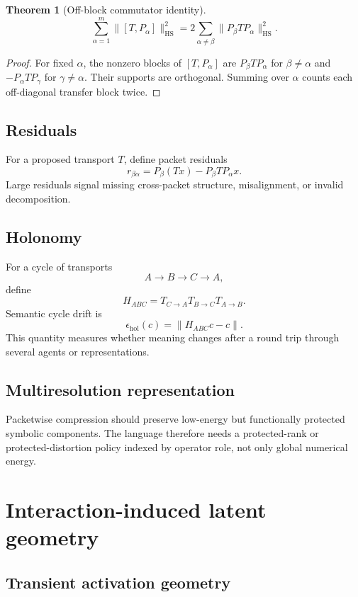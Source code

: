 \documentclass[11pt]{article}
\newtheorem{theorem}{Theorem}[section]
\theoremstyle{definition}
\theoremstyle{remark}
\begin{document}
\begin{theorem}[Off-block commutator identity]
\[
\sum_{\alpha=1}^m
\|[T,P_\alpha]\|_{\mathrm{HS}}^2
=
2\sum_{\alpha\ne\beta}
\|P_\beta T P_\alpha\|_{\mathrm{HS}}^2.
\]
\end{theorem}

\begin{proof}
For fixed \(\alpha\), the nonzero blocks of \([T,P_\alpha]\) are \(P_\beta T P_\alpha\) for \(\beta\ne\alpha\) and \(-P_\alpha T P_\gamma\) for \(\gamma\ne\alpha\). Their supports are orthogonal. Summing over \(\alpha\) counts each off-diagonal transfer block twice.
\end{proof}

\subsection{Residuals}

For a proposed transport \(T\), define packet residuals
\[
r_{\beta\alpha}
=
P_\beta(Tx)-P_\beta T P_\alpha x.
\]
Large residuals signal missing cross-packet structure, misalignment, or invalid decomposition.

\subsection{Holonomy}

For a cycle of transports
\[
A\to B\to C\to A,
\]
define
\[
H_{ABC}=T_{C\to A}T_{B\to C}T_{A\to B}.
\]
Semantic cycle drift is
\[
\epsilon_{\mathrm{hol}}(c)
=
\|H_{ABC}c-c\|.
\]
This quantity measures whether meaning changes after a round trip through several agents or representations.

\subsection{Multiresolution representation}

Packetwise compression should preserve low-energy but functionally protected symbolic components. The language therefore needs a protected-rank or protected-distortion policy indexed by operator role, not only global numerical energy.

\section{Interaction-induced latent geometry}

\subsection{Transient activation geometry}
\end{document}
